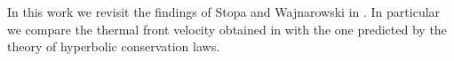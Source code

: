 In this work we revisit the findings of Stopa and Wajnarowski in \cite{Waj05}. In particular we compare the thermal front velocity obtained in  \cite{Waj05} with the one predicted by the theory of hyperbolic conservation laws. 
% 
%


